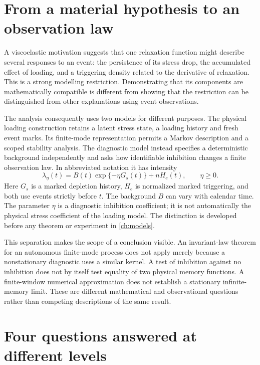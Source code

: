 \section{From a material hypothesis to an observation law}
\label{sec:intro_material_observation}

A viscoelastic motivation suggests that one relaxation function might describe several responses to an event: the persistence of its stress drop, the accumulated effect of loading, and a triggering density related to the derivative of relaxation. This is a strong modelling restriction. Demonstrating that its components are mathematically compatible is different from showing that the restriction can be distinguished from other explanations using event observations.

The analysis consequently uses two models for different purposes. The physical loading construction retains a latent stress state, a loading history and fresh event marks. Its finite-mode representation permits a Markov description and a scoped stability analysis. The diagnostic model instead specifies a deterministic background independently and asks how identifiable inhibition changes a finite observation law. In abbreviated notation it has intensity
\begin{equation}
 \lambda_\eta(t)=B(t)\exp\{-\eta G_s(t)\}+nH_e(t),
 \qquad \eta\geq 0.
 \label{eq:intro_diagnostic}
\end{equation}
Here $G_s$ is a marked depletion history, $H_e$ is normalized marked triggering, and both use events strictly before $t$. The background $B$ can vary with calendar time. The parameter $\eta$ is a diagnostic inhibition coefficient; it is not automatically the physical stress coefficient of the loading model. The distinction is developed before any theorem or experiment in \cref{ch:models}.

This separation makes the scope of a conclusion visible. An invariant-law theorem for an autonomous finite-mode process does not apply merely because a nonstationary diagnostic uses a similar kernel. A test of inhibition against no inhibition does not by itself test equality of two physical memory functions. A finite-window numerical approximation does not establish a stationary infinite-memory limit. These are different mathematical and observational questions rather than competing descriptions of the same result.

\section{Four questions answered at different levels}
\label{sec:intro_questions}

